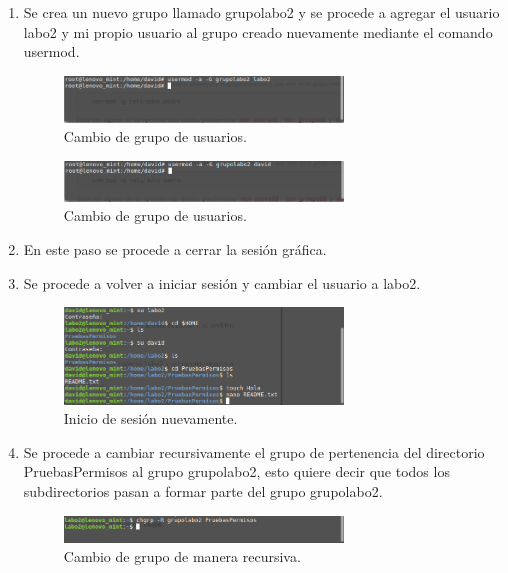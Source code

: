 \documentclass[11pt]{article}
\begin{document}
\begin{enumerate}
\begin{figure}[H]
\end{figure}

\item Se crea un nuevo grupo llamado grupolabo2 y se procede a agregar el usuario labo2 y mi propio usuario al grupo creado nuevamente mediante el comando usermod.

\begin{figure}[H]
  \centering
    \includegraphics[width=0.7\textwidth]{img/9}
  \caption{Cambio de grupo de usuarios.}
\end{figure}

\begin{figure}[H]
  \centering
    \includegraphics[width=0.7\textwidth]{img/10}
  \caption{Cambio de grupo de usuarios.}
\end{figure}

\item En este paso se procede a cerrar la sesión gráfica.

\item Se procede a volver a iniciar sesión y cambiar el usuario a labo2.
\begin{figure}[H]
  \centering
    \includegraphics[width=0.7\textwidth]{img/13}
  \caption{Inicio de sesión nuevamente.}
\end{figure}

\item Se procede a cambiar recursivamente el grupo de pertenencia del directorio PruebasPermisos al grupo grupolabo2, esto quiere decir que todos los subdirectorios pasan a formar parte del grupo grupolabo2.

\begin{figure}[H]
  \centering
    \includegraphics[width=0.7\textwidth]{img/25}
  \caption{Cambio de grupo de manera recursiva.}
 \end{figure} 


\end{enumerate}
\end{document}
